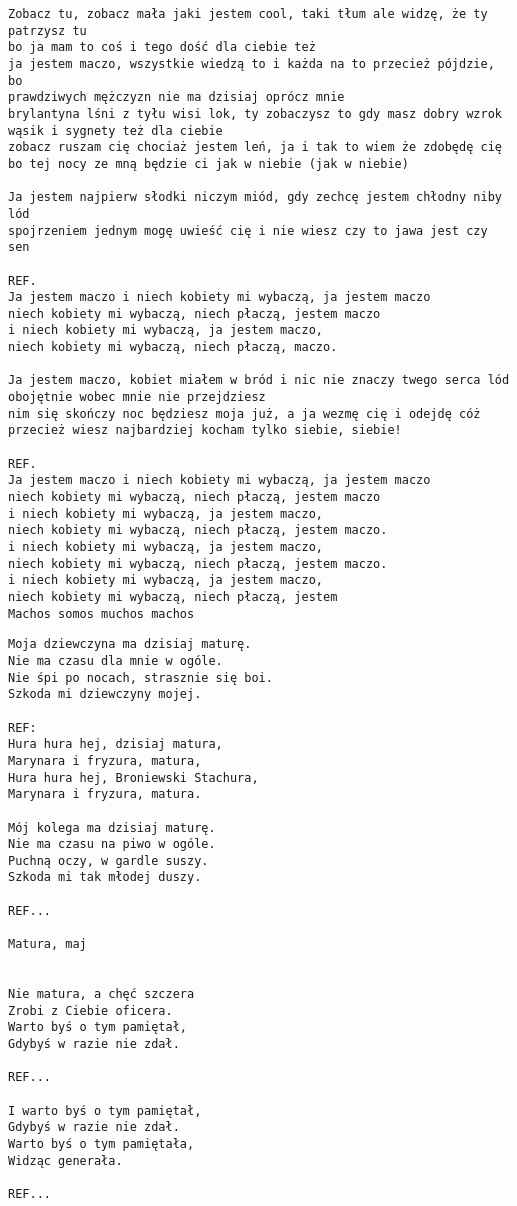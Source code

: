 \documentclass[12pt]{article}
\begin{document}
\begin{verbatim}
Zobacz tu, zobacz mała jaki jestem cool, taki tłum ale widzę, że ty patrzysz tu
bo ja mam to coś i tego dość dla ciebie też
ja jestem maczo, wszystkie wiedzą to i każda na to przecież pójdzie, bo
prawdziwych mężczyzn nie ma dzisiaj oprócz mnie
brylantyna lśni z tyłu wisi lok, ty zobaczysz to gdy masz dobry wzrok
wąsik i sygnety też dla ciebie
zobacz ruszam cię chociaż jestem leń, ja i tak to wiem że zdobędę cię
bo tej nocy ze mną będzie ci jak w niebie (jak w niebie)

Ja jestem najpierw słodki niczym miód, gdy zechcę jestem chłodny niby lód
spojrzeniem jednym mogę uwieść cię i nie wiesz czy to jawa jest czy sen

REF.
Ja jestem maczo i niech kobiety mi wybaczą, ja jestem maczo
niech kobiety mi wybaczą, niech płaczą, jestem maczo
i niech kobiety mi wybaczą, ja jestem maczo,
niech kobiety mi wybaczą, niech płaczą, maczo.

Ja jestem maczo, kobiet miałem w bród i nic nie znaczy twego serca lód
obojętnie wobec mnie nie przejdziesz
nim się skończy noc będziesz moja już, a ja wezmę cię i odejdę cóż
przecież wiesz najbardziej kocham tylko siebie, siebie!

REF.
Ja jestem maczo i niech kobiety mi wybaczą, ja jestem maczo
niech kobiety mi wybaczą, niech płaczą, jestem maczo
i niech kobiety mi wybaczą, ja jestem maczo,
niech kobiety mi wybaczą, niech płaczą, jestem maczo.
i niech kobiety mi wybaczą, ja jestem maczo,
niech kobiety mi wybaczą, niech płaczą, jestem maczo.
i niech kobiety mi wybaczą, ja jestem maczo,
niech kobiety mi wybaczą, niech płaczą, jestem
Machos somos muchos machos
\end{verbatim}
\clearpage

\begin{verbatim}
Moja dziewczyna ma dzisiaj maturę.
Nie ma czasu dla mnie w ogóle.
Nie śpi po nocach, strasznie się boi.
Szkoda mi dziewczyny mojej.

REF:
Hura hura hej, dzisiaj matura,
Marynara i fryzura, matura,
Hura hura hej, Broniewski Stachura,
Marynara i fryzura, matura.

Mój kolega ma dzisiaj maturę.
Nie ma czasu na piwo w ogóle.
Puchną oczy, w gardle suszy.
Szkoda mi tak młodej duszy.

REF...

Matura, maj


Nie matura, a chęć szczera
Zrobi z Ciebie oficera.
Warto byś o tym pamiętał,
Gdybyś w razie nie zdał.

REF...

I warto byś o tym pamiętał,
Gdybyś w razie nie zdał.
Warto byś o tym pamiętała,
Widząc generała.

REF...
\end{verbatim}
\clearpage
\end{document}
